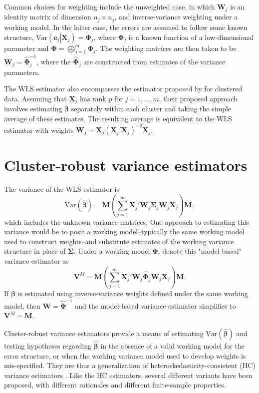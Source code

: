 \documentclass[12pt]{article}\usepackage[]{graphicx}\usepackage[]{color}
\newcommand{\Var}{\text{Var}}
\newcommand{\bm}{\mathbf}
\newcommand{\bs}{\boldsymbol}
\begin{document}
Common choices for weighting include the unweighted case, in which $\bm{W}_j$ is an identity matrix of dimension $n_j \times n_j$, and inverse-variance weighting under a working model. 
In the latter case, the errors are assumed to follow some known structure, $\Var\left(\bm{e}_j\left|\bm{X}_j\right.\right) = \bs\Phi_j$, where $\bs\Phi_j$ is a known function of a low-dimensional parameter and $\bs\Phi = \bigoplus_{j=1}^m \bs\Phi_j$. 
The weighting matrices are then taken to be $\bm{W}_j = \hat{\bs\Phi}_j^{-1}$, where the $\hat{\bs\Phi}_j$ are constructed from estimates of the variance parameters.

The WLS estimator also encompasses the estimator proposed by \citet{Ibragimov2010tstatistic} for clustered data. 
Assuming that $\bm{X}_j$ has rank $p$ for $j = 1,...,m$, their proposed approach involves estimating $\bs\beta$ separately within each cluster and taking the simple average of these estimates. 
The resulting average is equivalent to the WLS estimator with weights $\bm{W}_j = \bm{X}_j \left(\bm{X}_j'\bm{X}_j\right)^{-2} \bm{X}_j$.

\section{Cluster-robust variance estimators}
\label{sec:CRVE}

The variance of the WLS estimator is 
\begin{equation}
\label{eq:var_WLS}
\Var\left(\bs{\hat\beta}\right) = \bm{M}\left(\sum_{j=1}^m \bm{X}_j' \bm{W}_j \bs\Sigma_j \bm{W}_j\bm{X}_j\right) \bm{M},
\end{equation}
which includes the unknown variance matrices. 
One approach to estimating this variance would be to posit a working model--typically the same working model used to construct weights--and substitute estimates of the working variance structure in place of $\bs\Sigma$. 
Under a working model $\bs\Phi$, denote this "model-based" variance estimator as
\begin{equation}
\label{eq:V_model}
\bm{V}^M = \bm{M}\left(\sum_{j=1}^m \bm{X}_j' \bm{W}_j \hat{\bs\Phi}_j \bm{W}_j\bm{X}_j\right) \bm{M}.
\end{equation}
If $\bs\beta$ is estimated using inverse-variance weights defined under the same working model, then $\bm{W} = \hat{\bs\Phi}^{-1}$ and the model-based variance estimator simplifies to $\bm{V}^M = \bm{M}$. 

Cluster-robust variance estimators provide a means of estimating $\Var\left(\bs{\hat\beta}\right)$ and testing hypotheses regarding $\hat{\bs\beta}$ in the absence of a valid working model for the error structure, or when the working variance model used to develop weights is mis-specified. 
They are thus a generalization of heteroskedasticity-consistent (HC) variance estimators \citep{MacKinnon1985some}. 
Like the HC estimators, several different variants have been proposed, with different rationales and different finite-sample properties. 
\end{document}
